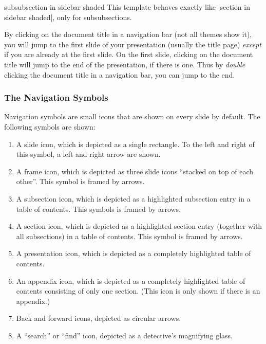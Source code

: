 \begin{element}{subsubsection in sidebar shaded}\yes\no\no
  This template behaves exactly like |section in sidebar shaded|,
  only for subsubsections.
\end{element}

By clicking on the document title in a navigation bar (not all themes
show it), you will jump to the first slide of your presentation
(usually the title page) \emph{except} if you are already at the first
slide. On the first slide, clicking on the document title will jump to
the end of the presentation, if there is one. Thus by \emph{double}
clicking the document title in a navigation bar, you can jump to the end.



\subsubsection{The Navigation Symbols}
\label{section-navigation-symbols}


Navigation symbols are small icons that are shown on every slide
by default. The following symbols are shown:
\begin{enumerate}
\item
  A slide icon, which is depicted as  a single rectangle. To the left and
  right of this symbol, a left and right arrow are shown.
\item
  A frame icon, which is depicted as three slide icons ``stacked on top of
  each other''. This symbol is framed by arrows.
\item
  A subsection icon, which is depicted as a highlighted subsection
  entry in a table of contents. This  symbols is framed by arrows.
\item
  A section icon, which is depicted as a highlighted section entry
  (together with all subsections) in a table of contents. This symbol
  is framed by arrows.
\item
  A presentation icon, which is depicted as a completely highlighted
  table of contents.
\item
  An appendix icon, which is depicted as a completely highlighted
  table of contents consisting of only one section. (This icon is only
  shown if there is an appendix.)
\item
  Back and forward icons, depicted as circular arrows.
\item
  A ``search'' or ``find'' icon, depicted as a detective's
  magnifying glass.
\end{enumerate}

